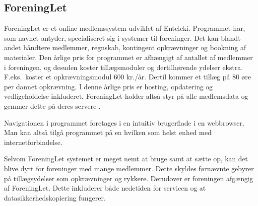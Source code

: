 


\subsection{ForeningLet} %
\label{sub:ForeningLet}

ForeningLet er et online medlemssystem udviklet af Enteleki. Programmet har, som navnet antyder, specialiseret sig i systemer til foreninger. Det kan blandt andet håndtere medlemmer, regnskab, kontingent opkrævninger og bookning af materialer. Den årlige pris for programmet er afhængigt af antallet af medlemmer i foreningen, og desuden koster tillægsmoduler og dertilhørende ydelser ekstra. F.eks.\ koster et opkrævningsmodul 600 kr./år. Dertil kommer et tillæg på 80 øre per dannet opkrævning. I denne årlige pris er hosting, opdatering og vedligeholdelse inkluderet. ForeningLet holder altså styr på alle medlemsdata og gemmer dette på deres servere \cite{foreninglet}.

Navigationen i programmet foretages i en intuitiv brugerflade i en webbrowser. Man kan altså tilgå programmet på en hvilken som helst enhed med internetforbindelse. 


Selvom ForeningLet systemet er meget nemt at bruge samt at sætte op, kan det blive dyrt for foreninger med mange medlemmer. Dette skyldes førnævnte gebyrer på tillægsydelser som opkrævninger og rykkere. Derudover er foreningen afgængig af ForeningLet. Dette inkluderer både nedetiden for servicen og at datasikkerhedskopiering fungerer.

